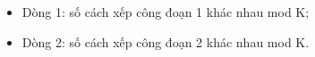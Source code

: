 \begin{itemize}
	\item     Dòng 1: số cách xếp công đoạn 1 khác nhau mod K;   
	\item     Dòng 2: số cách xếp công đoạn 2 khác nhau mod K.   
\end{itemize}

\